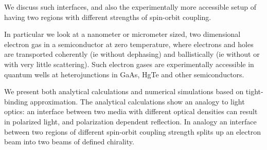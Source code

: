 We discuss such interfaces, and also the experimentally more accessible setup
of having two regions with different strengths of spin-orbit coupling.

In particular we look at a nanometer or micrometer sized, two dimensional
electron gas in a semiconductor at zero temperature, where electrons and holes
are transported coherently (ie without dephasing) and ballistically (ie
without or with very little scattering). Such electron gases are
experimentally accessible in quantum wells at heterojunctions in GaAs,
HgTe and other semiconductors.

We present both analytical calculations and numerical simulations based on
tight-binding approximation. The analytical calculations show an analogy to
light optics:  an interface between two media with different optical densities
can result in polarized light, and polarization dependent reflection. In
analogy an interface between two regions of different spin-orbit coupling
strength splits up an electron beam into two beams of defined chirality.

